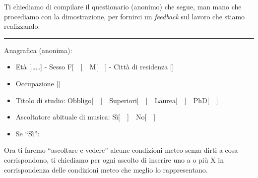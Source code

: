 \documentclass[12pt,a4paper]{report}
\begin{document}
\begin{mdframed}[leftmargin=-40pt,rightmargin=-40pt]
Ti chiediamo di compilare il questionario (anonimo) che segue, man mano che procediamo con la dimostrazione,
per fornirci un \textit{feedback} sul lavoro che stiamo realizzando.


\medskip
\hrule
\medskip

\begin{compactenum}
	\item Anagrafica (anonima):
	\begin{itemize}
		\item Età [\dots\dots] - Sesso F[~~]~~M[~~] - Città di residenza [\dotfill]
		\item Occupazione [\dotfill]
		\item Titolo di studio: Obbligo[~~]~~Superiori[~~]~~Laurea[~~]~~PhD[~~]
		\item Ascoltatore abituale di musica: Sì[~~]~~No[~~]
		\item Se ``Sì'':
		
	\end{itemize}
	
	\item Ora ti faremo ``ascoltare e vedere'' alcune condizioni meteo senza dirti a cosa corrispondono, ti chiediamo per ogni ascolto di inserire uno a o più X in corrispondenza delle condizioni meteo che meglio lo rappresentano. 
	

\end{compactenum}
\end{mdframed}
\end{document}
